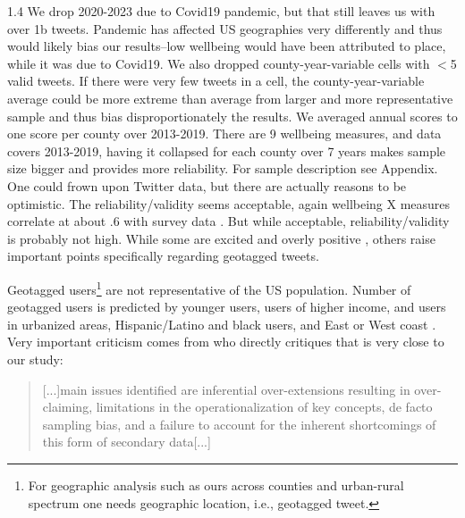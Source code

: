 \documentclass[10pt, letterpaper]{article}
\begin{document}
\begin{spacing}{1.4}
We drop 2020-2023 due to Covid19 pandemic, but that still leaves us with over
1b tweets. Pandemic has affected US geographies very differently and thus would 
likely bias our results--low wellbeing would have been attributed to place,
while it was due to Covid19. 
We also dropped county-year-variable cells with $<$5 valid tweets. If
there were very few tweets in a cell, the county-year-variable average could be 
 more extreme than average from larger and more representative sample and
thus bias disproportionately the results.
We averaged annual scores %
to one score per county over 2013-2019. %
 There are 9 wellbeing measures, and data covers
2013-2019, having it collapsed for each county over 7 years makes sample size
bigger and provides more reliability.
 For sample description see Appendix.
 One could frown upon Twitter data, but there are actually reasons
to be optimistic. 
 The reliability/validity seems acceptable, again wellbeing X
measures correlate at about .6 with survey data \citep{jaidka2020estimating}.
 But while acceptable, reliability/validity is probably not high. While some are excited
and overly positive \citep[e.g.,][]{karamouzas2022public}, others raise important
points specifically regarding geotagged tweets.

Geotagged users\footnote{For geographic analysis such as ours across counties and
  urban-rural spectrum one needs geographic location, i.e., geotagged tweet.} are not representative of the US population.
Number of geotagged users is predicted by younger users, users of higher income,
and users in urbanized areas,  Hispanic/Latino and black users, and
 East or West coast \citep{malik2015population}. 
 Very important criticism comes from \citet{jensen2017putting} who directly
 critiques \citet{mitchell13} that is very close to our study:

 \begin{quote} [...]main issues identified are inferential over-extensions
   resulting in over-claiming, limitations in the operationalization of key
   concepts, de facto sampling bias, and a failure to account for the inherent
   shortcomings of this form of secondary data[...]
 \end{quote}


\end{spacing}
\end{document}
